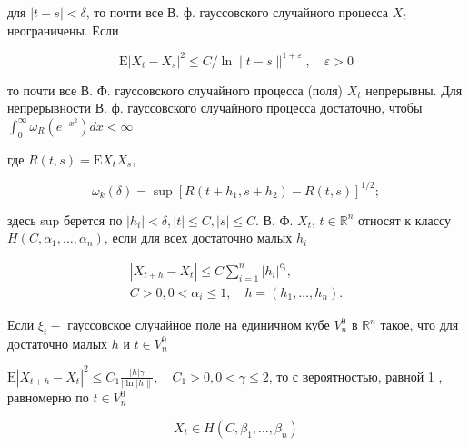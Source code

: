 \documentclass[10pt]{article}
\begin{document}
для $|t-s|<\delta$, то почти все В. ф. гауссовского случайного процесса $X_{t}$ неограничены. Если



\[

\mathrm{E}\left|X_{t}-X_{s}\right|^{2} \leqslant C / \ln \mid t-s \|^{1+\varepsilon}, \quad \varepsilon>0

\]



то почти все В. Ф. гауссовского случайного процесса (поля) $X_{t}$ непрерывны. Для непрерывности В. ф. гауссовского случайного процесса достаточно, чтобы $\int_{0}^{\infty} \omega_{R}\left(e^{-x^{2}}\right) d x<\infty$



где $R(t, s)=\mathrm{E} X_{t} X_{s}$,



\[

\omega_{k}(\delta)=\sup \left[R\left(t+h_{1}, s+h_{2}\right)-R(t, s)\right]^{1 / 2} ;

\]



здесь sup берется по $\left|h_{i}\right|<\delta,|t| \leqslant C,|s| \leqslant C$. В. Ф. $X_{t}$, $t \in \mathbb{R}^{n}$ относят к классу $H\left(C, \alpha_{1}, \ldots, \alpha_{n}\right)$, если для всех достаточно малых $h_{i}$



\[

\begin{gathered}

\left|X_{t+h}-X_{t}\right| \leqslant C \sum_{i=1}^{n}\left|h_{i}\right|^{c_{i}}, \\

C>0,0<\alpha_{i} \leqslant 1, \quad h=\left(h_{1}, \ldots, h_{n}\right) .

\end{gathered}

\]



Если $\xi_{t}-$ гауссовское случайное поле на единичном кубе $V_{n}^{0}$ в $\mathbb{R}^{n}$ такое, что для достаточно малых $h$ и $t \in V_{n}^{0}$



$\mathrm{E}\left|X_{t+h}-X_{t}\right|^{2} \leqslant C_{1} \frac{|h| \gamma}{|\ln | h \|}, \quad C_{1}>0,0<\gamma \leqslant 2$, то с вероятностью, равной 1 , равномерно по $t \in V_{n}^{0}$



\[

X_{t} \in H\left(C, \beta_{1}, \ldots, \beta_{n}\right)

\]
\end{document}

